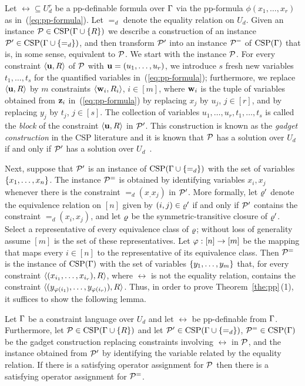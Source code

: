 Let $\rel\subseteq U_d^r$ be a pp-definable formula
over $\Gamma$ via the pp-formula $\phi(x_1,\ldots,x_r)$ as
in~(\ref{eq:pp-formula}). Let $=_d$ denote the equality relation on $U_d$. 
Given an instance
${\mathcal P}\in{\rm CSP}(\Gamma\cup\{R\})$ we describe a construction of an instance
${\mathcal P}'\in{\rm CSP}(\Gamma\cup\{=_d\})$, and then transform ${\mathcal P}'$ into an instance ${\mathcal P}^=$ of ${\rm CSP}(\Gamma)$ that is, in some sense, equivalent to ${\mathcal P}$. 
%
We start with the instance ${\mathcal P}$. For every constraint $\langle {\bf u},R \rangle$ of ${\mathcal P}$ with
${\bf u}=(u_1,\ldots,u_r)$, we
introduce $s$ fresh new variables $t_1,\ldots,t_s$ for the quantified
variables in~(\ref{eq:pp-formula}); furthermore, we replace $\langle {\bf u},R \rangle$ by $m$ constraints
$\langle {\bf w}_i,R_i \rangle$, $i\in [m]$, where ${\bf w}_i$ is the tuple of variables obtained
from ${\bf z}_i$ in~(\ref{eq:pp-formula}) by replacing $x_j$ by $u_j$, $j\in [r]$,
and by replacing $y_j$ by $t_j$, $j\in [s]$.
The collection of variables $u_1,\ldots,u_r,t_1,\ldots,t_s$ is called the
\emph{block} of the constraint $\langle {\bf u},R \rangle$ in ${\mathcal P}'$.
%
This construction is known as the \emph{gadget construction} in the CSP
literature and it is known that ${\mathcal P}$ has a solution over $U_d$
if and only if ${\mathcal P}'$ has a solution over $U_d$~\cite{Bulatov05:classifying,BKW17}.

Next, suppose that ${\mathcal P}'$ is an instance of ${\rm CSP}(\Gamma\cup\{=_d\})$ with the set of variables $\{x _1,\ldots, x _{n}\}$. The instance ${\mathcal P}^=$ is obtained by identifying variables $x_i,x_j$ whenever there is the constraint $=_d(x_,x_j)$ in ${\mathcal P}'$. More formally, let $\varrho'$ denote the equivalence relation on $[n]$ given by $(i,j)\in\varrho'$ if and only if ${\mathcal P}'$ contains the constraint $=_d(x_i,x_j)$, and let $\varrho$ be the symmetric-transitive closure of $\varrho'$. Select a representative of every equivalence class of $\varrho$; without loss of generality assume $[m]$ is the set of these representatives. Let $\varphi:[n]\to[m]$ be the mapping that maps every $i\in[n]$ to the representative of its equivalence class. Then ${\mathcal P}^=$ is the instance of ${\rm CSP}(\Gamma)$ with the set of variables $\{y _1,\ldots, y _{m}\}$ that, for every constraint $\langle (x_{i_1},\ldots, x_{i_r}),R \rangle$, where $\rel$ is not the equality relation, contains the constraint $\langle (y_{\varphi(i_1)},\ldots, y_{\varphi(i_r)}),R \rangle$.
%
Thus, in order to prove Theorem~\ref{the:pp}\,(1), it suffices to show the following lemma.

\begin{lemma}\label{lem:lift}
  Let $\Gamma$ be a constraint language over $U_d$ and let $\rel$ be pp-definable
  from $\Gamma$. Furthermore, let ${\mathcal P}\in{\rm CSP}(\Gamma\cup\{R\})$ and let
  ${\mathcal P}'\in{\rm CSP}(\Gamma\cup\{=_d\})$, ${\mathcal P}^=\in{\rm CSP}(\Gamma)$ be the gadget construction replacing constraints involving
  $\rel$ in ${\mathcal P}$, and the instance obtained from ${\mathcal P}'$ by identifying the variable related by the equality relation. If there is a satisfying operator assignment for ${\mathcal P}$ then there is a satisfying operator assignment for ${\mathcal P}^=$. 
\end{lemma}

